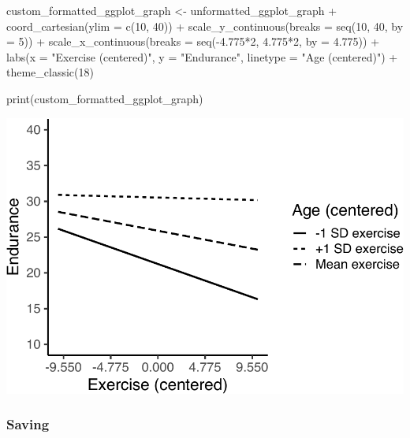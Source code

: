 \documentclass[
]{krantz}
\makeatletter
\newenvironment{Shaded}{\begin{snugshade}}{\end{snugshade}}
\newcommand{\AttributeTok}[1]{\textcolor[rgb]{0.61,0.61,0.61}{#1}}
\newcommand{\DecValTok}[1]{\textcolor[rgb]{0.06,0.06,0.06}{#1}}
\newcommand{\FloatTok}[1]{\textcolor[rgb]{0.06,0.06,0.06}{#1}}
\newcommand{\FunctionTok}[1]{\textcolor[rgb]{0,0,0}{#1}}
\newcommand{\NormalTok}[1]{#1}
\newcommand{\OtherTok}[1]{\textcolor[rgb]{0.37,0.37,0.37}{#1}}
\newcommand{\SpecialCharTok}[1]{\textcolor[rgb]{0,0,0}{#1}}
\newcommand{\StringTok}[1]{\textcolor[rgb]{0.5,0.5,0.5}{#1}}
\newenvironment{kframe}{%
\medskip{}
\setlength{\fboxsep}{.8em}
 \def\at@end@of@kframe{}%
 \ifinner\ifhmode%
  \def\at@end@of@kframe{\end{minipage}}%
  \begin{minipage}{\columnwidth}%
 \fi\fi%
 \def\FrameCommand##1{\hskip\@totalleftmargin \hskip-\fboxsep
 \colorbox{shadecolor}{##1}\hskip-\fboxsep
     \hskip-\linewidth \hskip-\@totalleftmargin \hskip\columnwidth}%
 \MakeFramed {\advance\hsize-\width
   \@totalleftmargin\z@ \linewidth\hsize
   \@setminipage}}%
 {\par\unskip\endMakeFramed%
 \at@end@of@kframe}
\renewenvironment{Shaded}{\begin{kframe}}{\end{kframe}}
\makeatother
\begin{document}
\begin{Shaded}
\begin{Highlighting}[]
\NormalTok{custom\_formatted\_ggplot\_graph }\OtherTok{\textless{}{-}}\NormalTok{ unformatted\_ggplot\_graph }\SpecialCharTok{+}
  \FunctionTok{coord\_cartesian}\NormalTok{(}\AttributeTok{ylim =} \FunctionTok{c}\NormalTok{(}\DecValTok{10}\NormalTok{, }\DecValTok{40}\NormalTok{)) }\SpecialCharTok{+}
  \FunctionTok{scale\_y\_continuous}\NormalTok{(}\AttributeTok{breaks =} \FunctionTok{seq}\NormalTok{(}\DecValTok{10}\NormalTok{, }\DecValTok{40}\NormalTok{, }\AttributeTok{by =} \DecValTok{5}\NormalTok{)) }\SpecialCharTok{+}
  \FunctionTok{scale\_x\_continuous}\NormalTok{(}\AttributeTok{breaks =} \FunctionTok{seq}\NormalTok{(}\SpecialCharTok{{-}}\FloatTok{4.775}\SpecialCharTok{*}\DecValTok{2}\NormalTok{, }\FloatTok{4.775}\SpecialCharTok{*}\DecValTok{2}\NormalTok{, }\AttributeTok{by =} \FloatTok{4.775}\NormalTok{)) }\SpecialCharTok{+}
  \FunctionTok{labs}\NormalTok{(}\AttributeTok{x =} \StringTok{"Exercise (centered)"}\NormalTok{,}
       \AttributeTok{y =} \StringTok{"Endurance"}\NormalTok{,}
       \AttributeTok{linetype =} \StringTok{"Age (centered)"}\NormalTok{) }\SpecialCharTok{+}
  \FunctionTok{theme\_classic}\NormalTok{(}\DecValTok{18}\NormalTok{)}

\FunctionTok{print}\NormalTok{(custom\_formatted\_ggplot\_graph)}
\end{Highlighting}
\end{Shaded}

\includegraphics{bookdown_files/figure-latex/unnamed-chunk-497-1.pdf}

\hypertarget{saving-1}{%
\subsubsection{Saving}\label{saving-1}}
\end{document}
